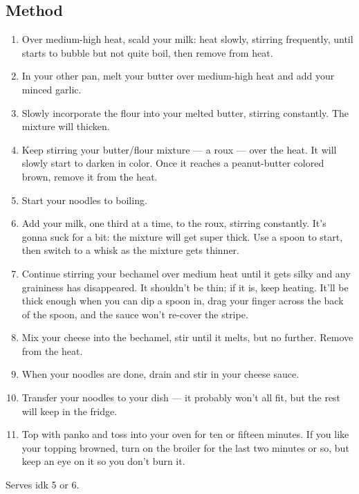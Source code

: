 \subsection*{Method}

\begin{enumerate}
  \item Over medium-high heat, scald your milk: heat slowly, stirring frequently, until starts to bubble but not quite boil, then remove from heat.
  \item In your other pan, melt your butter over medium-high heat and add your minced garlic.
  \item Slowly incorporate the flour into your melted butter, stirring constantly. The mixture will thicken.
  \item Keep stirring your butter/flour mixture --- a roux --- over the heat. It will slowly start to darken in color. Once it reaches a peanut-butter colored brown, remove it from the heat.
  \item Start your noodles to boiling.
  \item Add your milk, one third at a time, to the roux, stirring constantly. It's gonna suck for a bit: the mixture will get super thick. Use a spoon to start, then switch to a whisk as the mixture gets thinner.
  \item Continue stirring your bechamel over medium heat until it gets silky and any graininess has disappeared. It shouldn't be thin; if it is, keep heating. It'll be thick enough when you can dip a spoon in, drag your finger across the back of the spoon, and the sauce won't re-cover the stripe.
  \item Mix your cheese into the bechamel, stir until it melts, but no further. Remove from the heat.
  \item When your noodles are done, drain and stir in your cheese sauce.
  \item Transfer your noodles to your dish --- it probably won't all fit, but the rest will keep in the fridge.
  \item Top with panko and toss into your oven for ten or fifteen minutes. If you like your topping browned, turn on the broiler for the last two minutes or so, but keep an eye on it so you don't burn it.
\end{enumerate}

Serves idk 5 or 6.
